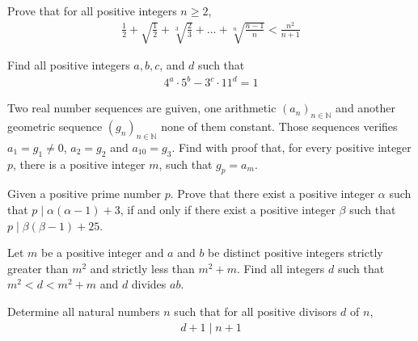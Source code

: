 \begin{problem}
	Prove that for all positive integers $n \geq 2$,
	\begin{align*}
		\frac{1}{2} + \sqrt{\frac{1}{2}}+ \sqrt[3]{\frac{2}{3}}+ \dots + \sqrt[n]{\frac{n-1}{n}} < \frac{n^2}{n+1}
	\end{align*}
\end{problem}

\begin{problem}
	Find all positive integers $a, b, c$, and $d$ such that
	\begin{align*}
		4^a \cdot 5^b - 3^c \cdot 11^d = 1
	\end{align*}
\end{problem}

\begin{problem}
	Two real number sequences are guiven, one arithmetic $\left(a_n\right)_{n\in \mathbb {N}}$ and another geometric sequence $\left(g_n\right)_{n\in \mathbb {N}}$ none of them constant. Those sequences verifies $a_1=g_1\neq 0$, $a_2=g_2$ and $a_{10}=g_3$. Find with proof that, for every positive integer $p$, there is a positive integer $m$, such that $g_p=a_m$. %
\end{problem}

\begin{problem}
	Given a positive prime number $p$. Prove that there exist a positive integer $\alpha$ such that $p\mid \alpha(\alpha-1)+3$, if and only if there exist a positive integer $\beta$ such that $p\mid \beta(\beta-1)+25$. %
\end{problem}

\begin{problem}
	Let $m$ be a positive integer and $a$ and $b$ be distinct positive integers strictly greater than $m^2$ and strictly less than $m^2+m$. Find all integers $d$ such that $m^2 < d < m^2+m$ and $d$ divides $ab$. %
\end{problem}

\begin{problem}
	Determine all natural numbers $n$ such that for all positive divisors $d$ of $n$,
	\begin{align*}
		d + 1 \mid n + 1
	\end{align*}
\end{problem}

